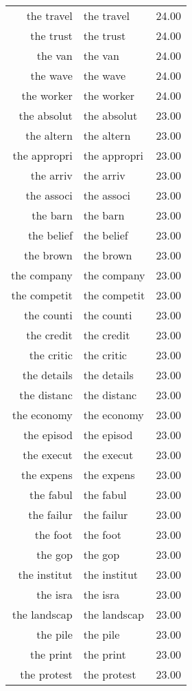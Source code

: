 \begin{table}[ht]
\begin{tabular}{rlr}
  the travel & the travel & 24.00 \\ 
  the trust & the trust & 24.00 \\ 
  the van & the van & 24.00 \\ 
  the wave & the wave & 24.00 \\ 
  the worker & the worker & 24.00 \\ 
  the absolut & the absolut & 23.00 \\ 
  the altern & the altern & 23.00 \\ 
  the appropri & the appropri & 23.00 \\ 
  the arriv & the arriv & 23.00 \\ 
  the associ & the associ & 23.00 \\ 
  the barn & the barn & 23.00 \\ 
  the belief & the belief & 23.00 \\ 
  the brown & the brown & 23.00 \\ 
  the company & the company & 23.00 \\ 
  the competit & the competit & 23.00 \\ 
  the counti & the counti & 23.00 \\ 
  the credit & the credit & 23.00 \\ 
  the critic & the critic & 23.00 \\ 
  the details & the details & 23.00 \\ 
  the distanc & the distanc & 23.00 \\ 
  the economy & the economy & 23.00 \\ 
  the episod & the episod & 23.00 \\ 
  the execut & the execut & 23.00 \\ 
  the expens & the expens & 23.00 \\ 
  the fabul & the fabul & 23.00 \\ 
  the failur & the failur & 23.00 \\ 
  the foot & the foot & 23.00 \\ 
  the gop & the gop & 23.00 \\ 
  the institut & the institut & 23.00 \\ 
  the isra & the isra & 23.00 \\ 
  the landscap & the landscap & 23.00 \\ 
  the pile & the pile & 23.00 \\ 
  the print & the print & 23.00 \\ 
  the protest & the protest & 23.00 \\ 

\end{tabular}
\end{table}
